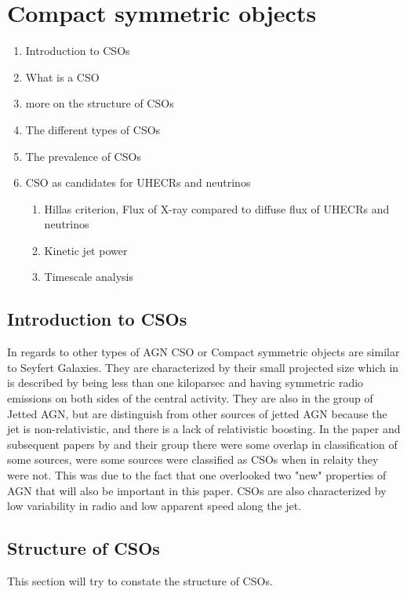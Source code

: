 \section{Compact symmetric objects}
\begin{enumerate}
    \item Introduction to CSOs
    \item What is a CSO
    \item more on the structure of CSOs
    \item The different types of CSOs
    \item The prevalence of CSOs 
    \item CSO as candidates for UHECRs and neutrinos
    \begin{enumerate}
        
       
        \item Hillas criterion, Flux of X-ray compared to diffuse flux of UHECRs and neutrinos 
        \item Kinetic jet power
        \item Timescale analysis
    \end{enumerate}
\end{enumerate}

\subsection*{Introduction to CSOs}
In regards to other types of AGN CSO or Compact symmetric objects are similar to Seyfert Galaxies. They are characterized by their small projected size 
which in \cite{kiehlmann2023compact} is described by being less than one kiloparsec and having symmetric radio emissions on both sides of the central activity. They are also in the group
of Jetted AGN, but are distinguish from other sources of jetted AGN because the jet is non-relativistic, and there is a lack of relativistic boosting. In the paper and subsequent 
papers by \cite{kiehlmann2023compact} and their group there were some overlap in classification of some sources, were some sources were classified as CSOs when in relaity they were not. 
This was due to the fact that one overlooked two "new" properties of AGN that will also be important in this paper. CSOs are also characterized by low variability in radio and low 
apparent speed along the jet. 

\subsection{Structure of CSOs}
This section will try to constate the structure of CSOs. 





